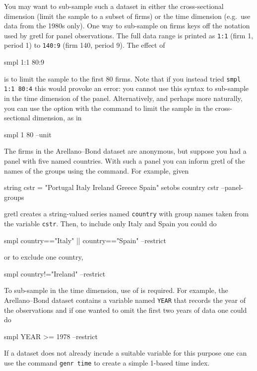 You may want to sub-sample such a dataset in either the
cross-sectional dimension (limit the sample to a subset of firms) or
the time dimension (e.g.\ use data from the 1980s only). One way to
sub-sample on firms keys off the notation used by gretl for panel
observations. The full data range is printed as \texttt{1:1} (firm 1,
period 1) to \texttt{140:9} (firm 140, period 9). The effect of
%
\begin{code}
smpl 1:1 80:9
\end{code}
%
is to limit the sample to the first 80 firms. Note that if you instead
tried \texttt{smpl 1:1 80:4} this would provoke an error: you cannot
use this syntax to sub-sample in the time dimension of the
panel. Alternatively, and perhaps more naturally, you can use the
 option with the  command to limit the sample
in the cross-sectional dimension, as in
%
\begin{code}
smpl 1 80 --unit
\end{code}

The firms in the Arellano--Bond dataset are anonymous, but suppose you
had a panel with five named countries. With such a panel you can
inform gretl of the names of the groups using the 
command. For example, given
%
\begin{code}
string cstr = "Portugal Italy Ireland Greece Spain"
setobs country cstr --panel-groups 
\end{code}
%
gretl creates a string-valued series named \texttt{country} with group
names taken from the variable \texttt{cstr}. Then, to include only
Italy and Spain you could do
%
\begin{code}
smpl country=="Italy" || country=="Spain" --restrict
\end{code}
%
or to exclude one country,
%
\begin{code}
smpl country!="Ireland" --restrict
\end{code}

To sub-sample in the time dimension, use of  is
required. For example, the Arellano--Bond dataset contains a variable
named \texttt{YEAR} that records the year of the observations and if
one wanted to omit the first two years of data one could do
%
\begin{code}
smpl YEAR >= 1978 --restrict
\end{code}
%
If a dataset does not already incude a suitable variable for this
purpose one can use the command \texttt{genr time} to create a simple
1-based time index.

